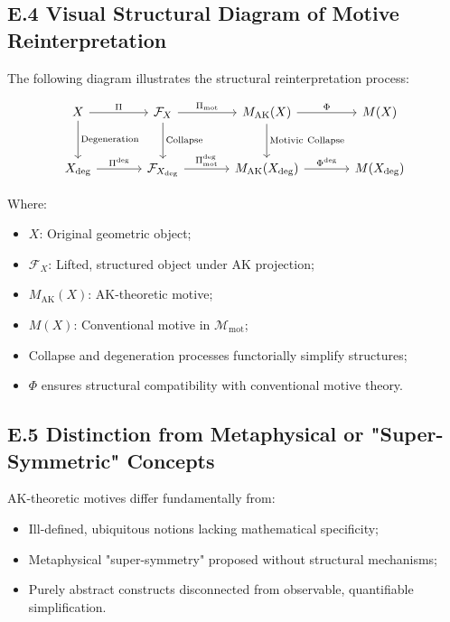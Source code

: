 \documentclass[11pt]{article}
\begin{document}
\subsection*{E.4 Visual Structural Diagram of Motive Reinterpretation}

The following diagram illustrates the structural reinterpretation process:

\[
\begin{tikzcd}[column sep=large, row sep=large]
X \arrow[r, "\Pi"] \arrow[d, "\mathrm{Degeneration}"]
& \mathcal{F}_X \arrow[d, "\mathrm{Collapse}"] \arrow[r, "\Pi_{\mathrm{mot}}"]
& M_{\mathrm{AK}}(X) \arrow[d, "\mathrm{Motivic\ Collapse}"] \arrow[r, "\Phi"]
& M(X) \\
X_{\mathrm{deg}} \arrow[r, "\Pi^{\mathrm{deg}}"]
& \mathcal{F}_{X_{\mathrm{deg}}} \arrow[r, "\Pi_{\mathrm{mot}}^{\mathrm{deg}}"]
& M_{\mathrm{AK}}(X_{\mathrm{deg}}) \arrow[r, "\Phi^{\mathrm{deg}}"]
& M(X_{\mathrm{deg}})
\end{tikzcd}
\]

Where:

\begin{itemize}
    \item $X$: Original geometric object;
    \item $\mathcal{F}_X$: Lifted, structured object under AK projection;
    \item $M_{\mathrm{AK}}(X)$: AK-theoretic motive;
    \item $M(X)$: Conventional motive in $\mathcal{M}_{\mathrm{mot}}$;
    \item Collapse and degeneration processes functorially simplify structures;
    \item $\Phi$ ensures structural compatibility with conventional motive theory.
\end{itemize}

\subsection*{E.5 Distinction from Metaphysical or "Super-Symmetric" Concepts}

AK-theoretic motives differ fundamentally from:

\begin{itemize}
    \item Ill-defined, ubiquitous notions lacking mathematical specificity;
    \item Metaphysical "super-symmetry" proposed without structural mechanisms;
    \item Purely abstract constructs disconnected from observable, quantifiable simplification.
\end{itemize}
\end{document}

